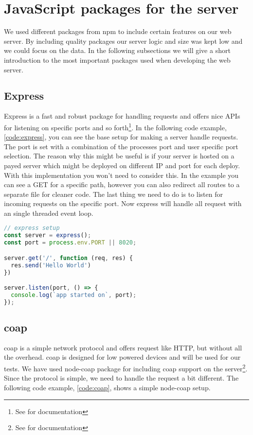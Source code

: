 \documentclass[USenglish]{ifimaster}  %
\begin{document}
\section{JavaScript packages for the server}
We used different packages from \acrshort{npm} to include certain features on our web server. By including quality packages our server logic and size was kept low and we could focus on the data. In the following subsections we will give a short introduction to the most important packages used when developing the web server.

\subsection{Express}
Express is a fast and robust package for handling requests and offers nice APIs for listening on specific ports and so forth\footnote{See \cite{npm:express} for documentation}. In the following code example, \ref{code:express}, you can see the base setup for making a server handle requests. The port is set with a combination of the processes port and user specific port selection. The reason why this might be useful is if your server is hosted on a payed server which might be deployed on different IP and port for each deploy. With this implementation you won't need to consider this. In the example you can see a GET for a specific path, however you can also redirect all routes to a separate file for cleaner code. The last thing we need to do is to listen for incoming requests on the specific port. Now express will handle all request with an single threaded event loop.

\begin{lstlisting}[caption={Base express setup},label={code:express},language=JavaScript]
// express setup
const server = express();
const port = process.env.PORT || 8020;

server.get('/', function (req, res) {
  res.send('Hello World')
})

server.listen(port, () => {
  console.log(`app started on`, port);
});
\end{lstlisting}

\subsection{\acrshort{coap}}
\acrfull{coap} is a simple network protocol and offers request like HTTP, but without all the overhead. \acrshort{coap} is designed for low powered devices and will be used for our tests. We have used node-coap package for including \acrshort{coap} support on the server\footnote{See \cite{npm:coap} for documentation}. Since the protocol is simple, we need to handle the request a bit different. The following code example, \vref{code:coap}, shows a simple node-coap setup.
\end{document}
